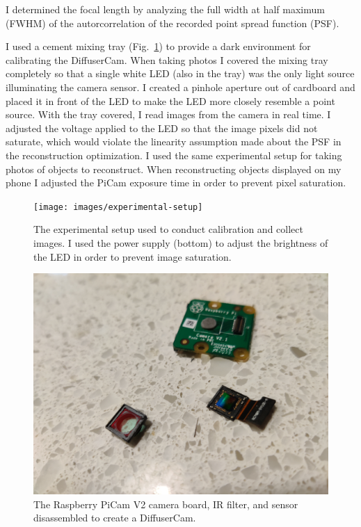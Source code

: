 \documentclass[final]{cvpr}
\begin{document}
I determined the focal length by analyzing the full width at half maximum
(FWHM) of the autorcorrelation of the recorded point spread function (PSF).

I used a cement mixing tray (Fig.~\ref{fig:experimental-setup}) to provide
a dark environment for calibrating the DiffuserCam.
When taking photos I covered the mixing tray completely so that a single white
LED (also in the tray) was the only light source illuminating the camera
sensor.
I created a pinhole aperture out of cardboard and placed it in front of the LED
to make the LED more closely resemble a point source.
With the tray covered, I read images from the camera in real time.
I adjusted the voltage applied to the LED so that the image pixels did not
saturate, which would violate the linearity assumption made about the PSF in
the reconstruction optimization.
I used the same experimental setup for taking photos of objects to reconstruct.
When reconstructing objects displayed on my phone I adjusted the PiCam exposure
time in order to prevent pixel saturation.


\begin{figure}[t]
	\centering
	\texttt{[image: images/experimental-setup]}
	\caption{\label{fig:experimental-setup}
		The experimental setup used to conduct calibration and collect images.
		I used the power supply (bottom) to adjust the brightness of the LED in order to prevent image saturation.}

\end{figure}



\begin{figure}[t]
	\centering
	\includegraphics[width=1.0\linewidth]{images/board-filter-sensor}
	\caption{\label{fig:board-filter-sensor}
		The Raspberry PiCam V2 camera board, IR filter, and sensor disassembled to create a DiffuserCam.}
\end{figure}
\end{document}
